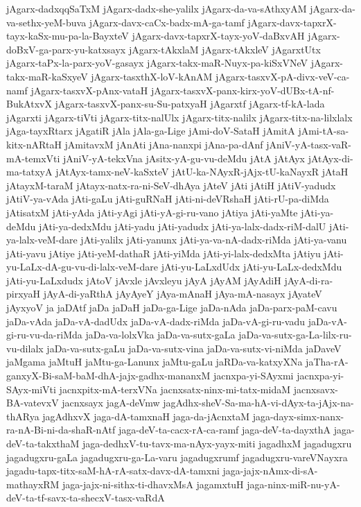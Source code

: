 {jAgarx-dadxqqSaTxM
jAgarx-dadx-she-yalilx
jAgarx-da-va-sAthxyAM
jAgarx-da-va-sethx-yeM-buva
jAgarx-davx-caCx-badx-mA-ga-tamf
jAgarx-davx-tapxrX-tayx-kaSx-mu-pa-la-BayxteV
jAgarx-davx-tapxrX-tayx-yoV-daBxvAH
jAgarx-doBxV-ga-parx-yu-katxsayx
jAgarx-tAkxlaM
jAgarx-tAkxleV
jAgarxtUtx
jAgarx-taPx-la-parx-yoV-gasayx
jAgarx-takx-maR-Nuyx-pa-kiSxVNeV
jAgarx-takx-maR-kaSxyeV
jAgarx-tasxthX-loV-kAnAM
jAgarx-tasxvX-pA-divx-veV-ca-namf
jAgarx-tasxvX-pAnx-vataH
jAgarx-tasxvX-panx-kirx-yoV-dUBx-tA-nf-BukAtxvX
jAgarx-tasxvX-panx-su-Su-patxyaH
jAgarxtf
jAgarx-tf-kA-lada
jAgarxti
jAgarx-tiVti
jAgarx-titx-nalUlx
jAgarx-titx-nalilx
jAgarx-titx-na-lilxlalx
jAga-tayxRtarx
jAgatiR
jAla
jAla-ga-Lige
jAmi-doV-SataH
jAmitA
jAmi-tA-sa-kitx-nARtaH
jAmitavxM
jAnAti
jAna-nanxpi
jAna-pa-dAnf
jAniV-yA-tasx-vaR-mA-temxVti
jAniV-yA-tekxVna
jAsitx-yA-gu-vu-deMdu
jAtA
jAtAyx
jAtAyx-di-ma-tatxyA
jAtAyx-tamx-neV-kaSxteV
jAtU-ka-NAyxR-jAjx-tU-kaNayxR
jAtaH
jAtayxM-taraM
jAtayx-natx-ra-ni-SeV-dhAya
jAteV
jAti
jAtiH
jAtiV-yadudx
jAtiV-ya-vAda
jAti-gaLu
jAti-guRNaH
jAti-ni-deVRshaH
jAti-rU-pa-diMda
jAtisatxM
jAti-yAda
jAti-yAgi
jAti-yA-gi-ru-vano
jAtiya
jAti-yaMte
jAti-ya-deMdu
jAti-ya-dedxMdu
jAti-yadu
jAti-yadudx
jAti-ya-lalx-dadx-riM-dalU
jAti-ya-lalx-veM-dare
jAti-yalilx
jAti-yanunx
jAti-ya-va-nA-dadx-riMda
jAti-ya-vanu
jAti-yavu
jAtiye
jAti-yeM-dathaR
jAti-yiMda
jAti-yi-lalx-dedxMta
jAtiyu
jAti-yu-LaLx-dA-gu-vu-di-lalx-veM-dare
jAti-yu-LaLxdUdx
jAti-yu-LaLx-dedxMdu
jAti-yu-LaLxdudx
jAtoV
jAvxle
jAvxleyu
jAyA
jAyAM
jAyAdiH
jAyA-di-ra-pirxyaH
jAyA-di-yaRthA
jAyAyeY
jAya-mAnaH
jAya-mA-nasayx
jAyateV
jAyxyoV
ja
jaDAtf
jaDa
jaDaH
jaDa-ga-Lige
jaDa-nAda
jaDa-parx-paM-cavu
jaDa-vAda
jaDa-vA-dadUdx
jaDa-vA-dadx-riMda
jaDa-vA-gi-ru-vadu
jaDa-vA-gi-ru-vu-da-riMda
jaDa-va-lolxVka
jaDa-va-sutx-gaLa
jaDa-va-sutx-ga-La-lilx-ru-vu-dilalx
jaDa-va-sutx-gaLu
jaDa-va-sutx-vina
jaDa-va-sutx-vi-niMda
jaDaveV
jaMgama
jaMtuH
jaMtu-ga-Lanunx
jaMtu-gaLu
jaRDa-va-katxyXNa
jaTha-rA-ganxyX-Bi-saM-baM-dhA-jajx-gadhx-mananxM
jacnxpa-yi-SAyxmi
jacnxpa-yi-SAyx-miVti
jacnxpitx-mA-terxVNa
jacnxsatx-ninx-mi-tatx-midaM
jacnxsavx-BA-vatevxV
jacnxsayx
jagA-deVmw
jagAdhx-sheV-Sa-ma-hA-vi-dAyx-ta-jAjx-na-thARya
jagAdhxvX
jaga-dA-tamxnaH
jaga-da-jAcnxtaM
jaga-dayx-simx-nanx-ra-nA-Bi-ni-da-shaR-nAtf
jaga-deV-ta-cacx-rA-ca-ramf
jaga-deV-ta-dayxthA
jaga-deV-ta-takxthaM
jaga-dedhxV-tu-tavx-ma-nAyx-yayx-miti
jagadhxM
jagadugxru
jagadugxru-gaLa
jagadugxru-ga-La-varu
jagadugxrumf
jagadugxru-vareVNayxra
jagadu-tapx-titx-saM-hA-rA-satx-davx-dA-tamxni
jaga-jajx-nAmx-di-sA-mathayxRM
jaga-jajx-ni-sithx-ti-dhavxMsA
jagamxtuH
jaga-ninx-miR-nu-yA-deV-ta-tf-savx-ta-shecxV-tasx-vaRdA
}
